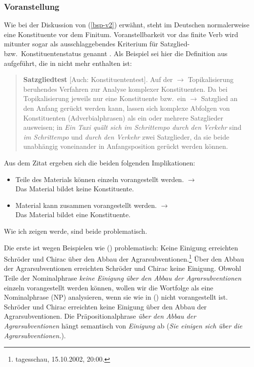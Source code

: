 



\subsubsection{Voranstellung}
\label{sec-konst-test-probleme-voranstellung} 

Wie bei der Diskussion von (\ref{bsp-v2}) erwähnt, steht im Deutschen normalerweise
eine Konstituente vor dem Finitum. Voranstellbarkeit vor das finite Verb wird mitunter
sogar als ausschlaggebendes Kriterium für Satzglied- bzw.\ Konstituentenstatus genannt \citep[]{Duden2005}. Als Beispiel sei hier die Definition aus  aufgeführt, die in
 nicht mehr enthalten ist:
\begin{quote}
\textbf{Satzgliedtest} [Auch: Konstituententest]. Auf der $\to$ Topikalisierung
beruhendes Verfahren zur Analyse komplexer Konstituenten. Da bei Topikalisierung
jeweils nur eine Konstituente bzw.\ ein $\to$ Satzglied an den Anfang gerückt werden kann,
lassen sich komplexe Abfolgen von Konstituenten (\zb Adverbialphrasen) als
ein oder mehrere Satzglieder ausweisen; in \textit{Ein Taxi quält sich im Schrittempo
durch den Verkehr} sind \textit{im Schrittempo} und \textit{durch den Verkehr}
zwei Satzglieder, da sie beide unabhängig voneinander in Anfangsposition gerückt werden
können. \citep[]{Bussmann83a}
\end{quote}

Aus dem Zitat ergeben sich die beiden folgenden Implikationen:
\begin{itemize}
\item Teile des Materials können einzeln vorangestellt werden. $\to$\\
      Das Material bildet keine Konstituente.
\item Material kann zusammen vorangestellt werden. $\to$\\
      Das Material bildet eine Konstituente.
\end{itemize}
Wie ich zeigen werde, sind beide problematisch.

Die erste ist wegen Beispielen wie () problematisch:
\eal
\label{ex-Agrarsubventionen}
\ex Keine Einigung erreichten Schröder und Chirac über den Abbau der Agrarsubventionen.\footnote{tagesschau, 15.10.2002, 20:00.}
\ex Über den Abbau der Agrarsubventionen erreichten Schröder und Chirac keine Einigung.
\zl
Obwohl Teile der Nominalphrase \emph{keine Einigung über den Abbau der Agrarsubventionen}
einzeln vorangestellt werden können, wollen wir die Wortfolge als eine Nominalphrase (NP) analysieren,
wenn sie wie in () nicht vorangestellt ist.
\ea
Schröder und Chirac erreichten keine Einigung über den Abbau der Agrarsubventionen.
\z
Die Präpositionalphrase \emph{über den Abbau der Agrarsubventionen} hängt semantisch von \emph{Einigung}
ab (\emph{Sie einigen sich über die Agrarsubventionen.}).

